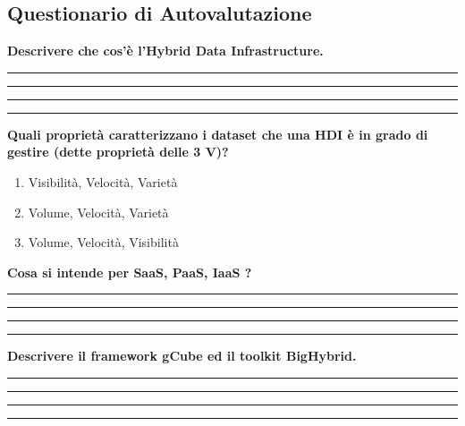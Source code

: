 \documentclass[11pt]{article}
\newcommand{\voceU}[1]{%
	\item #1\dotfill\Square%
}
\begin{document}
\subsection{Questionario di Autovalutazione}
\textbf{Descrivere che cos'è l'Hybrid Data Infrastructure.}\\[5ex]
\rule[5mm]{\textwidth}{0.1mm} 
\rule[5mm]{\textwidth}{0.1mm} 
\rule[5mm]{\textwidth}{0.1mm} 
\rule[5mm]{\textwidth}{0.1mm} 
\textbf{Quali proprietà caratterizzano i dataset che una HDI è in grado di gestire (dette proprietà delle 3 V)? }
\begin{enumerate}
	\voceU{Visibilità, Velocità, Varietà}
	\voceU{Volume, Velocità, Varietà}
	\voceU{Volume, Velocità, Visibilità}\\
\end{enumerate}
\textbf{Cosa si intende per SaaS, PaaS, IaaS ?}\\[5ex]
\rule[5mm]{\textwidth}{0.1mm} 
\rule[5mm]{\textwidth}{0.1mm} 
\rule[5mm]{\textwidth}{0.1mm} 
\rule[5mm]{\textwidth}{0.1mm} 
\textbf{Descrivere il framework gCube ed il toolkit BigHybrid.}\\[5ex]
\rule[5mm]{\textwidth}{0.1mm} 
\rule[5mm]{\textwidth}{0.1mm} 
\rule[5mm]{\textwidth}{0.1mm} 
\rule[5mm]{\textwidth}{0.1mm} 

\newpage


\clearpage
{}
\nocite{*}


\end{document}
